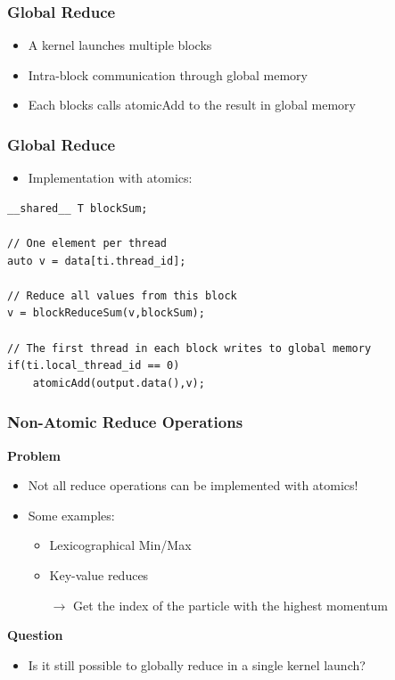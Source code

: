 \documentclass[aspectratio=169,handout]{beamer}
\begin{document}
\begin{frame}[fragile]
\frametitle{Global Reduce}
\begin{itemize}
	\item A kernel launches multiple blocks
	\item<2-> Intra-block communication through global memory
	\item<3->[$\rightarrow$] Each blocks calls atomicAdd to the result in global memory
\end{itemize}


\end{frame}


\begin{frame}[fragile]
\frametitle{Global Reduce}
\begin{itemize}
	\item Implementation with atomics:
\end{itemize}

\begin{lstlisting}
__shared__ T blockSum;

// One element per thread
auto v = data[ti.thread_id];

// Reduce all values from this block
v = blockReduceSum(v,blockSum);

// The first thread in each block writes to global memory
if(ti.local_thread_id == 0)
	atomicAdd(output.data(),v);
\end{lstlisting}
\end{frame}


\frame
{	
	\frametitle{Non-Atomic Reduce Operations}
	\textbf{Problem}
	\begin{itemize}
		\item Not all reduce operations can be implemented with atomics!
		\item<2-> Some examples:
		\begin{itemize}
			\item Lexicographical Min/Max
			\item Key-value reduces
			\item[$\rightarrow$] Get the index of the particle with the highest momentum
		\end{itemize}		
	\end{itemize}
\textbf{Question}
	\begin{itemize}
	\item Is it still possible to globally reduce in a single kernel launch?
		\end{itemize}
}
\end{document}
